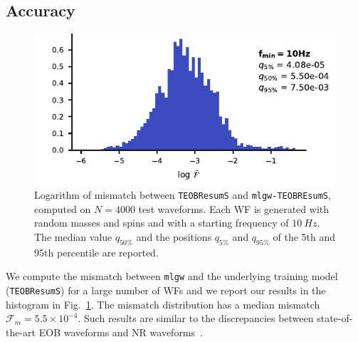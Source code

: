 \documentclass[twocolumn,showpacs,preprintnumbers,nofootinbib,prd,
superscriptaddress,10pt]{revtex4-1}
\begin{document}
\subsection{Accuracy}
\begin{figure}
	\centering
    \includegraphics[width=\linewidth]{img/F_hist.pdf}
	\caption{Logarithm of mismatch between \texttt{TEOBResumS} and \texttt{mlgw-TEOBREsumS}, computed on $N=4000$ test waveforms. 
	Each WF is generated with random masses and spins and with a starting frequency of $\SI{10}{Hz}$.
	The median value $q_{50\%}$ and the positions $q_{5\%}$ and $q_{95\%}$ of the 5th and 95th percentile are reported.
}
	\label{fig:F_hist}
\end{figure}
We compute the mismatch between \texttt{mlgw} and the underlying training model (\texttt{TEOBResumS}) for a large number of WFs
and we report our results in the histogram in Fig.~\ref{fig:F_hist}. The mismatch distribution has 
a median mismatch ${\mathcal{F}_m = 5.5 \times {10^{-4}}}$. Such results are similar to the discrepancies 
between state-of-the-art EOB waveforms and NR waveforms~\cite{Bohe:2016gbl, Nagar:2018zoe, Nagar:2020pcj}.
\end{document}
